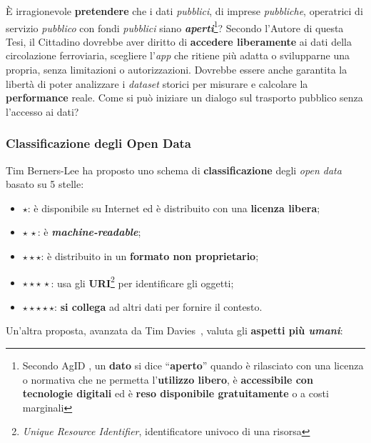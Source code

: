 \documentclass[12pt,a4paper,italian]{report}
\begin{document}
È irragionevole \textbf{pretendere} che i dati \textit{pubblici}, di
imprese \textit{pubbliche}, operatrici di servizio \textit{pubblico}
con fondi \textit{pubblici} siano
\textbf{\textit{aperti}}\footnote{Secondo AgID \cite{AgidOpenData}, un
    \textbf{dato} si dice ``\textbf{aperto}'' quando è rilasciato con
    una licenza o normativa che ne permetta l'\textbf{utilizzo
        libero}, è \textbf{accessibile con tecnologie digitali} ed è
    \textbf{reso disponibile gratuitamente} o a costi marginali}?
Secondo l'Autore di questa Tesi, il Cittadino dovrebbe aver diritto di
\textbf{accedere liberamente} ai dati della circolazione ferroviaria,
scegliere l'\textit{app} che ritiene più adatta o svilupparne una
propria, senza limitazioni o autorizzazioni.  Dovrebbe essere anche
garantita la libertà di poter analizzare i \textit{dataset} storici
per misurare e calcolare la \textbf{performance} reale.  Come si può
iniziare un dialogo sul trasporto pubblico senza l'accesso ai dati?

\subsubsection{Classificazione degli Open Data}

Tim Berners-Lee ha proposto \cite{W3LinkedData} uno schema di
\textbf{classificazione} degli \textit{open data} basato su 5 stelle:
\begin{itemize}
    \item $\star$: è disponibile su Internet ed è distribuito con una
    \textbf{licenza libera};
    \item $\star\,\star$: è \textbf{\textit{machine-readable}};
    \item $\star \star \star$: è distribuito in un \textbf{formato non
        proprietario};
    \item $\star \star \star\,\star$: usa gli
    \textbf{URI}\footnote{\textit{Unique Resource Identifier},
        identificatore univoco di una risorsa} per identificare gli
    oggetti;
    \item $\star \star \star \star \star$: \textbf{si collega} ad
    altri dati per fornire il contesto.
\end{itemize}

Un'altra proposta, avanzata da Tim Davies~\cite{DaviesOpenData},
valuta gli \textbf{aspetti più \textit{umani}}:
\end{document}
